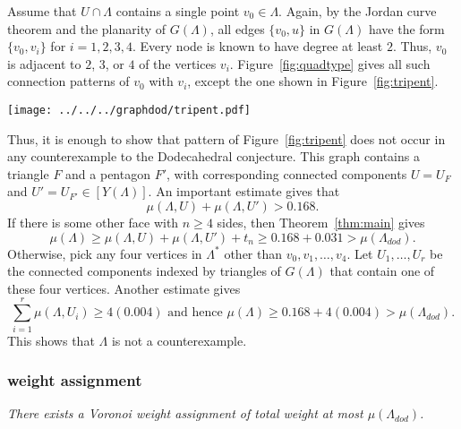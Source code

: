 Assume that $U\cap\Lambda$ contains a single point $v_0\in\Lambda$.  Again, by
the Jordan curve theorem and the planarity of $G(\Lambda)$, 
all edges $\{v_0,u\}$ in $G(\Lambda)$ have the form
$\{v_0,v_i\}$ for $i=1,2,3,4$.  Every node is known to have degree
at least $2$.  Thus,  $v_0$ is adjacent to $2$, $3$, or $4$ of the vertices $v_i$.
Figure~\ref{fig:quadtype} gives all such connection patterns of $v_0$ with $v_i$, except
the one shown in Figure~\ref{fig:tripent}.  


\begin{floatingfigure}{25mm}
  \begin{center}
  \texttt{[image: ../../../graphdod/tripent.pdf]}
  \end{center}
  \caption{}
\label{fig:tripent}
\end{floatingfigure}




Thus, it is enough to show that pattern of Figure~\ref{fig:tripent} does not occur 
in any counterexample to the Dodecahedral conjecture.  This graph contains a triangle
$F$ and a pentagon $F'$, with corresponding connected components
$U=U_F$ and $U'=U_{F'}\in[Y(\Lambda)]$.
An important estimate \cite[Lemma~10.1]{arx} gives that
$$
\mu(\Lambda,U) + \mu(\Lambda,U') > 0.168.
$$
If there is some other face  with $n\ge 4$ sides, then 
Theorem~\ref{thm:main} gives
$$
\mu(\Lambda) \ge \mu(\Lambda,U)+\mu(\Lambda,U') + t_n \ge 0.168 + 0.031 > \mu(\Lambda_{dod}).
$$
Otherwise, pick any four vertices in $\Lambda^*$ other than $v_0,v_1,\ldots,v_4$.  Let $U_1,\ldots,U_r$ be the connected components
indexed by triangles of $G(\Lambda)$
that contain one of these four vertices.  
Another estimate \cite[Lemma~5.2]{arx} gives
$$
\sum_{i=1}^r \mu(\Lambda,U_i) \ge 4 (0.004) \text{ and hence }
\mu(\Lambda) \ge 0.168 + 4(0.004) > \mu(\Lambda_{dod}).
$$
This shows that $\Lambda$ is not a counterexample.


\subsubsection{weight assignment}

{\it There exists a Voronoi weight assignment of total weight at most $\mu(\Lambda_{dod})$.}

